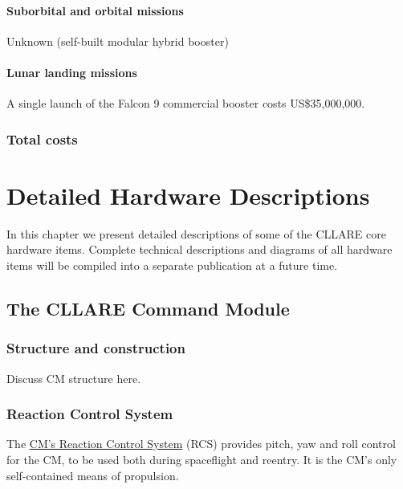 \documentclass{report}
\begin{document}
\subsubsection{Suborbital and orbital missions}

Unknown (self-built modular hybrid booster)

\subsubsection{Lunar landing missions}

A single launch of the Falcon 9 commercial booster costs US\$35,000,000.

\subsection{Total costs}


\chapter{Detailed Hardware Descriptions} \label{chap:detailed}

In this chapter we present detailed descriptions of some of the CLLARE core hardware items.  Complete technical descriptions and diagrams of all hardware items will be compiled into a separate publication at a future time.

\section{The CLLARE Command Module}

\subsection{Structure and construction}

Discuss CM structure here.

\subsection{Reaction Control System}

The \href{http://cstart.org/wiki/CLLARE_CM_Reaction_Control_System}{CM's Reaction Control System} (RCS) provides pitch, yaw and roll control for the CM, to be used both during spaceflight and reentry. It is the CM's only self-contained means of propulsion.
\end{document}
